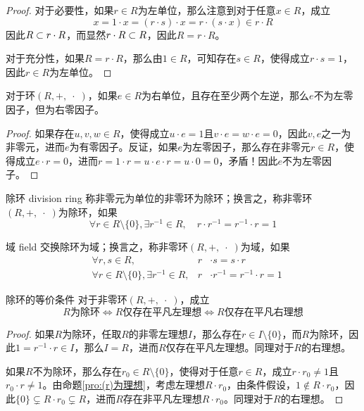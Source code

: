 \begin{proof}
	对于必要性，如果$r\in R$为左单位，那么注意到对于任意$x\in R$，成立
	$$
	x=1\cdot x=(r\cdot s)\cdot x=r\cdot (s\cdot x)\in r\cdot R
	$$
	因此$R\subset r\cdot R$，而显然$r\cdot R\subset R$，因此$R=r\cdot R$。
	
	对于充分性，如果$R=r\cdot R$，那么由$1\in R$，可知存在$s\in R$，使得成立$r\cdot s=1$，因此$r\in R$为左单位。
\end{proof}

\begin{proposition}
	对于环$(R,+,\;\cdot\;)$，如果$e\in R$为右单位，且存在至少两个左逆，那么$e$不为左零因子，但为右零因子。
\end{proposition}

\begin{proof}
	如果存在$u,v,w\in R$，使得成立$u\cdot e=1$且$v\cdot e=w\cdot e=0$，因此$v,e$之一为非零元，进而$e$为有零因子。反证，如果$e$为左零因子，那么存在非零元$r\in R$，使得成立$e\cdot r=0$，进而$r=1\cdot r=u\cdot e \cdot r=u\cdot 0=0$，矛盾！因此$e$不为左零因子。
\end{proof}

\begin{definition}{除环 division ring}
	称非零元为单位的非零环为除环；换言之，称非零环$(R,+,\;\cdot\;)$为除环，如果
	$$
	\forall r\in R\setminus\{0\},\exists r^{-1}\in R,\quad r\cdot r^{-1}=r^{-1}\cdot r=1
	$$
\end{definition}

\begin{definition}{域 field}
	交换除环为域；换言之，称非零环$(R,+,\;\cdot\;)$为域，如果
	\begin{align*}
		&\forall r,s\in R,& r &\cdot s=s\cdot r \\
		&\forall r\in R\setminus\{0\},\exists r^{-1}\in R,& r &\cdot r^{-1}=r^{-1}\cdot r=1
	\end{align*}
\end{definition}

\begin{proposition}{除环的等价条件}
	对于非零环$(R,+,\;\cdot\;)$，成立
	$$
	R\text{为除环}\iff R\text{仅存在平凡左理想}\iff R\text{仅存在平凡右理想}
	$$
\end{proposition}

\begin{proof}
	如果$R$为除环，任取$R$的非零左理想$I$，那么存在$r\in I\setminus\{0\}$，而$R$为除环，因此$1=r^{-1}\cdot r\in I$，那么$I=R$，进而$R$仅存在平凡左理想。同理对于$R$的右理想。
	
	如果$R$不为除环，那么存在$r_0\in R\setminus\{0\}$，使得对于任意$r\in R$，成立$r\cdot r_0\ne1$且$r_0\cdot r\ne 1$。由命题\ref{pro:(r)为理想}，考虑左理想$R\cdot r_0$，由条件假设，$1\notin R\cdot r_0$，因此$\{0\}\subsetneq R\cdot r_0 \subsetneq R$，进而$R$存在非平凡左理想$R\cdot r_0$。同理对于$R$的右理想。
\end{proof}


